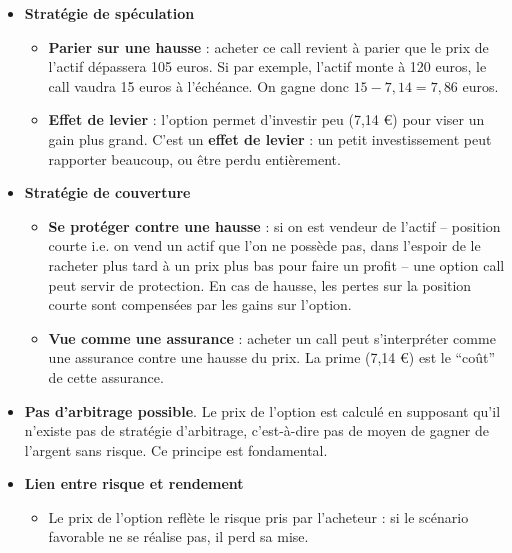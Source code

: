 \documentclass[12pt,a4paper]{article}
\begin{document}
\begin{itemize}

    \item \textbf{Stratégie de spéculation}

    \begin{itemize}
        \item \textbf{Parier sur une hausse} : acheter ce call revient à parier que le prix de l’actif dépassera 105 euros. Si par exemple, l’actif monte à 120 euros, le call vaudra 15 euros à l’échéance. On gagne donc \( 15 - 7{,}14 = 7{,}86 \) euros.
        
        \item \textbf{Effet de levier} : l’option permet d’investir peu (7,14 €) pour viser un gain plus grand. C'est un \textbf{effet de levier} : un petit investissement peut rapporter beaucoup, ou être perdu entièrement.
    \end{itemize}

    \item \textbf{Stratégie de couverture}

    \begin{itemize}
        \item \textbf{Se protéger contre une hausse} : si on est vendeur de l’actif -- position courte i.e. on vend un actif que l’on ne possède pas, dans l’espoir de le racheter plus tard à un prix plus bas pour faire un profit -- une option call peut servir de protection. En cas de hausse, les pertes sur la position courte sont compensées par les gains sur l’option.
        
        \item \textbf{Vue comme une assurance} : acheter un call peut s’interpréter comme une assurance contre une hausse du prix. La prime (7,14 €) est le “coût” de cette assurance.
    \end{itemize}

    \item \textbf{Pas d’arbitrage possible}. Le prix de l’option est calculé en supposant qu’il n’existe pas de stratégie d’arbitrage, c’est-à-dire pas de moyen de gagner de l’argent sans risque. Ce principe est fondamental.

    \item \textbf{Lien entre risque et rendement}

    \begin{itemize}
        \item Le prix de l’option reflète le risque pris par l’acheteur : si le scénario favorable ne se réalise pas, il perd sa mise.
        

\end{itemize}
\end{itemize}
\end{document}

